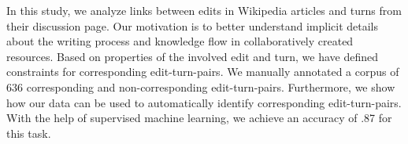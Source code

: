 In this study, we analyze links between edits in Wikipedia articles and turns from their discussion page. Our motivation is to better understand implicit details about the writing process and knowledge flow in collaboratively created resources. Based on properties of the involved edit and turn, we have defined constraints for corresponding edit-turn-pairs. We manually annotated a corpus of 636 corresponding and non-corresponding edit-turn-pairs. Furthermore, we show how our data can be used to automatically identify corresponding edit-turn-pairs. With the help of supervised machine learning, we achieve an accuracy of .87 for this task.
